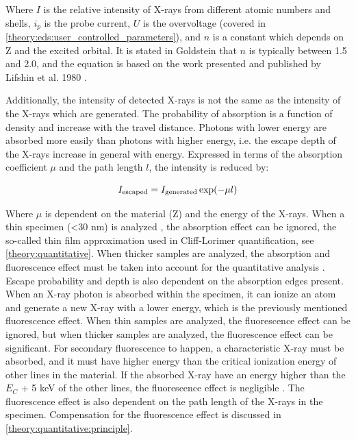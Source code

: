 Where $I$ is the relative intensity of X-rays from different atomic numbers and shells, $i_p$ is the probe current, $U$ is the overvoltage (covered in \cref{theory:eds:user_controlled_parameters}), and $n$ is a constant which depends on Z and the excited orbital.
It is stated in Goldstein that $n$ is typically between 1.5 and 2.0, and the equation is based on the work presented and published by Lifshin et al. 1980 \cite{lifshin1980}.



Additionally, the intensity of detected X-rays is not the same as the intensity of the X-rays which are generated.
The probability of absorption is a function of density and increase with the travel distance.
Photons with lower energy are absorbed more easily than photons with higher energy, i.e. the escape depth of the X-rays increase in general with energy.
Expressed in terms of the absorption coefficient $\mu$ and the path length $l$, the intensity is reduced by:

\begin{equation}
    \label{eq:theory:xray_formation:escape}
    I_{\textnormal{escaped}} = I_{\textnormal{generated}} \exp(-\mu l)
\end{equation}

Where $\mu$ is dependent on the material (Z) and the energy of the X-rays.
When a thin specimen (<30 nm) is analyzed \cite{watanabe_williams_zeta_2006}, the absorption effect can be ignored, the so-called thin film approximation used in Cliff-Lorimer quantification, see \cref{theory:quantitative}.
When thicker samples are analyzed, the absorption and fluorescence effect must be taken into account for the quantitative analysis \cite{goldstein_scanning_2018}.
Escape probability and depth is also dependent on the absorption edges present.
When an X-ray photon is absorbed within the specimen, it can ionize an atom and generate a new X-ray with a lower energy, which is the previously mentioned fluorescence effect.
When thin samples are analyzed, the fluorescence effect can be ignored, but when thicker samples are analyzed, the fluorescence effect can be significant.
For secondary fluorescence to happen, a characteristic X-ray must be absorbed, and it must have higher energy than the critical ionization energy of other lines in the material.
If the absorbed X-ray have an energy higher than the $E_C$ + 5 keV of the other lines, the fluorescence effect is negligible \cite[p. 306]{goldstein_scanning_2018}.
The fluorescence effect is also dependent on the path length of the X-rays in the specimen.
Compensation for the fluorescence effect is discussed in \cref{theory:quantitative:principle}.









